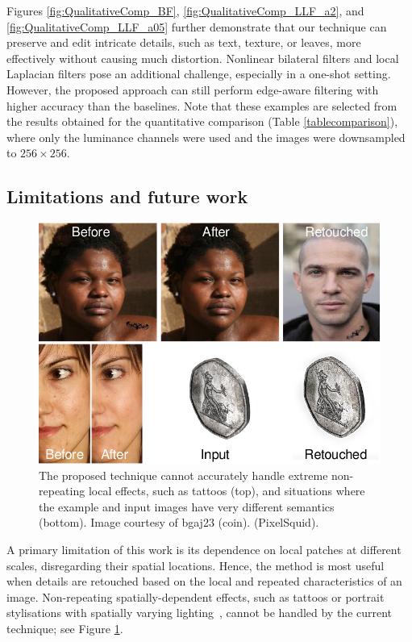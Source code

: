 Figures \ref{fig:QualitativeComp_BF}, \ref{fig:QualitativeComp_LLF_a2}, and \ref{fig:QualitativeComp_LLF_a05} further demonstrate that our technique can preserve and edit intricate details, such as text, texture, or leaves, more effectively without causing much distortion. Nonlinear bilateral filters and local Laplacian filters pose an additional challenge, especially in a one-shot setting. However, the proposed approach can still perform edge-aware filtering with higher accuracy than the baselines. Note that these examples are selected from the results obtained for the quantitative comparison (Table \ref{tablecomparison}), where only the luminance channels were used and the images were downsampled to $256 \times 256$.


\subsection{Limitations and future work}
\begin{figure}[th] %
	\centering
	\includegraphics[width=0.8\columnwidth]{Chapters/detail-retouching-figs/Limitations.pdf}
    \caption{\label{fig:limitations} The proposed technique cannot accurately handle extreme non-repeating local effects, such as tattoos (top), and situations where the example and input images have very different semantics (bottom). Image courtesy of bgaj23 (coin). (PixelSquid).}

\end{figure}
A primary limitation of this work is its dependence on local patches at different scales, disregarding their spatial locations. Hence, the method is most useful when details are retouched based on the local and repeated characteristics of an image. Non-repeating spatially-dependent effects, such as tattoos or portrait stylisations with spatially varying lighting~\cite{Shih14Style}, cannot be handled by the current technique; see Figure \ref{fig:limitations}.

